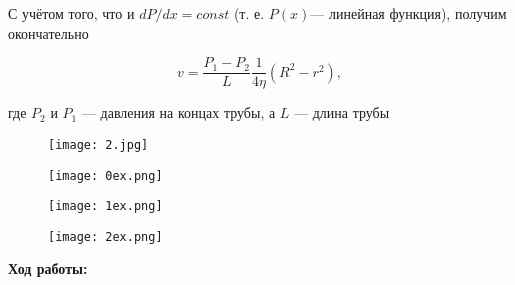 \documentclass{article}
\begin{document}
С учётом того, что и $dP/dx = const$ (т. е. $P(x)$— линейная функция), получим окончательно

\begin{equation}
        v = \frac{P_1 - P_2}{L} \frac{1}{4 \eta} (R^2 - r^2),
\end{equation}

где $P_2$ и $P_1$ — давления на концах трубы, а $L$ — длина трубы

\begin{figure}[htp]
\centering
\texttt{[image: 2.jpg]}
\end{figure}


\begin{figure}[htp]
\centering
\texttt{[image: 0ex.png]}
\end{figure}


\begin{figure}[htp]
\centering
\texttt{[image: 1ex.png]}
\end{figure}


\begin{figure}[htp]
\centering
\texttt{[image: 2ex.png]}
\end{figure}


\newpage
\textbf{Ход работы:}
\end{document}
